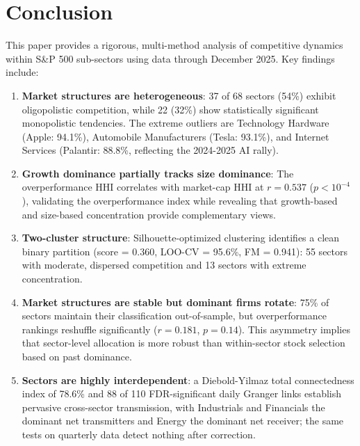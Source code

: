 \documentclass[11pt]{article}
\begin{document}
\section{Conclusion}

This paper provides a rigorous, multi-method analysis of competitive dynamics within S\&P 500 sub-sectors using data through December 2025. Key findings include:

\begin{enumerate}
    \item \textbf{Market structures are heterogeneous}: 37 of 68 sectors (54\%) exhibit oligopolistic competition, while 22 (32\%) show statistically significant monopolistic tendencies. The extreme outliers are Technology Hardware (Apple: 94.1\%), Automobile Manufacturers (Tesla: 93.1\%), and Internet Services (Palantir: 88.8\%, reflecting the 2024-2025 AI rally).

    \item \textbf{Growth dominance partially tracks size dominance}: The overperformance HHI correlates with market-cap HHI at $r = 0.537$ ($p < 10^{-4}$), validating the overperformance index while revealing that growth-based and size-based concentration provide complementary views.

    \item \textbf{Two-cluster structure}: Silhouette-optimized clustering identifies a clean binary partition (score = 0.360, LOO-CV = 95.6\%, FM = 0.941): 55 sectors with moderate, dispersed competition and 13 sectors with extreme concentration.

    \item \textbf{Market structures are stable but dominant firms rotate}: 75\% of sectors maintain their classification out-of-sample, but overperformance rankings reshuffle significantly ($r = 0.181$, $p = 0.14$). This asymmetry implies that sector-level allocation is more robust than within-sector stock selection based on past dominance.

    \item \textbf{Sectors are highly interdependent}: a Diebold-Yilmaz total connectedness index of 78.6\% and 88 of 110 FDR-significant daily Granger links establish pervasive cross-sector transmission, with Industrials and Financials the dominant net transmitters and Energy the dominant net receiver; the same tests on quarterly data detect nothing after correction.
\end{enumerate}
\end{document}
